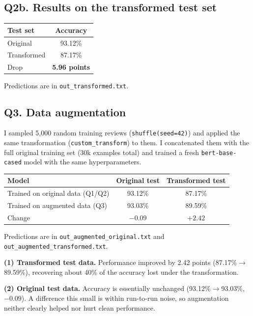 \documentclass[11pt]{article}
\begin{document}
\subsection*{Q2b. Results on the transformed test set}
\begin{center}
\begin{tabular}{lc}
\toprule
Test set & Accuracy \\
\midrule
Original & 93.12\% \\
Transformed & 87.17\% \\
\midrule
Drop & \textbf{5.96 points} \\
\bottomrule
\end{tabular}
\end{center}
Predictions are in \texttt{out\_transformed.txt}.

\subsection*{Q3. Data augmentation}
I sampled 5{,}000 random training reviews (\texttt{shuffle(seed=42)}) and applied the same transformation
(\texttt{custom\_transform})
to them. I concatenated them with the full original training set (30k examples total) and trained a fresh
\texttt{bert-base-cased} model with the same hyperparameters.

\begin{center}
\begin{tabular}{lcc}
\toprule
Model & Original test & Transformed test \\
\midrule
Trained on original data (Q1/Q2) & 93.12\% & 87.17\% \\
Trained on augmented data (Q3)   & 93.03\% & 89.59\% \\
\midrule
Change & $-0.09$ & $+2.42$ \\
\bottomrule
\end{tabular}
\end{center}
Predictions are in \texttt{out\_augmented\_original.txt} and \texttt{out\_augmented\_transformed.txt}.

\textbf{(1) Transformed test data.} Performance improved by 2.42 points (87.17\%$\to$89.59\%), recovering about
40\% of the accuracy lost under the transformation.

\textbf{(2) Original test data.} Accuracy is essentially unchanged (93.12\%$\to$93.03\%, $-0.09$). A difference this
small is within run-to-run noise, so augmentation neither clearly helped nor hurt clean performance.
\end{document}
